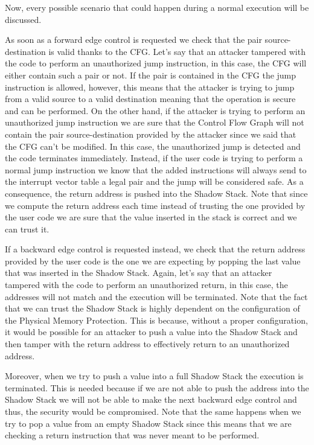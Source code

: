 Now, every possible scenario that could happen during a normal execution will be
discussed.

As soon as a forward edge control is requested we check that the pair source-destination
is valid thanks to the CFG. Let's say that an attacker tampered with the code to
perform an unauthorized jump instruction, in this case, the CFG will either
contain such a pair or not. If the pair is contained in the CFG the jump instruction
is allowed, however, this means that the attacker is trying to jump from a valid
source to a valid destination meaning that the operation is secure and can be performed.
On the other hand, if the attacker is trying to perform an unauthorized jump instruction
we are sure that the Control Flow Graph will not contain the pair source-destination
provided by the attacker since we said that the CFG can't be modified. In this
case, the unauthorized jump is detected and the code terminates immediately.
Instead, if the user code is trying to perform a normal jump instruction we know
that the added instructions will always send to the interrupt vector table a legal
pair and the jump will be considered safe. As a consequence, the return address is
pushed into the Shadow Stack. Note that since we compute the return address each
time instead of trusting the one provided by the user code we are sure that the
value inserted in the stack is correct and we can trust it.

If a backward edge control is requested instead, we check that the return address
provided by the user code is the one we are expecting by popping the last value that
was inserted in the Shadow Stack. Again, let's say that an attacker tampered with
the code to perform an unauthorized return, in this case, the addresses will not
match and the execution will be terminated. Note that the fact that we can trust
the Shadow Stack is highly dependent on the configuration of the Physical Memory
Protection. This is because, without a proper configuration, it would be possible
for an attacker to push a value into the Shadow Stack and then tamper with the return
address to effectively return to an unauthorized address.

Moreover, when we try to push a value into a full Shadow Stack the execution is
terminated. This is needed because if we are not able to push the address into the
Shadow Stack we will not be able to make the next backward edge control and thus,
the security would be compromised. Note that the same happens when we try to pop
a value from an empty Shadow Stack since this means that we are checking a return
instruction that was never meant to be performed.

